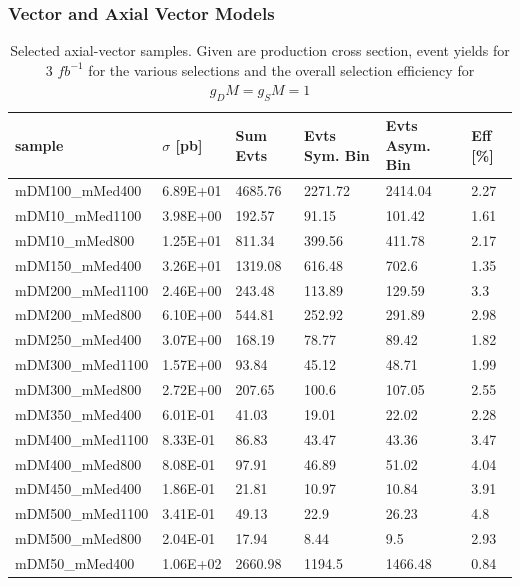 \subsubsection{Vector and Axial Vector Models}
\begin{table}[h]
\centering
\begin{tabular}{llllll}
\hline
sample             & $\sigma$ [pb] & Sum Evts       & Evts Sym. Bin & Evts Asym. Bin & Eff  [\%]   \\\hline
mDM100\_mMed400  & 6.89E+01 & 4685.76 & 2271.72 & 2414.04 & 2.27 \\
mDM10\_mMed1100  & 3.98E+00 & 192.57  & 91.15   & 101.42  & 1.61 \\
mDM10\_mMed800   & 1.25E+01 & 811.34  & 399.56  & 411.78  & 2.17 \\
mDM150\_mMed400  & 3.26E+01 & 1319.08 & 616.48  & 702.6   & 1.35 \\
mDM200\_mMed1100 & 2.46E+00 & 243.48  & 113.89  & 129.59  & 3.3  \\
mDM200\_mMed800  & 6.10E+00 & 544.81  & 252.92  & 291.89  & 2.98 \\
mDM250\_mMed400  & 3.07E+00 & 168.19  & 78.77   & 89.42   & 1.82 \\
mDM300\_mMed1100 & 1.57E+00 & 93.84   & 45.12   & 48.71   & 1.99 \\
mDM300\_mMed800  & 2.72E+00 & 207.65  & 100.6   & 107.05  & 2.55 \\
mDM350\_mMed400  & 6.01E-01 & 41.03   & 19.01   & 22.02   & 2.28 \\
mDM400\_mMed1100 & 8.33E-01 & 86.83   & 43.47   & 43.36   & 3.47 \\
mDM400\_mMed800  & 8.08E-01 & 97.91   & 46.89   & 51.02   & 4.04 \\
mDM450\_mMed400  & 1.86E-01 & 21.81   & 10.97   & 10.84   & 3.91 \\
mDM500\_mMed1100 & 3.41E-01 & 49.13   & 22.9    & 26.23   & 4.8  \\
mDM500\_mMed800  & 2.04E-01 & 17.94   & 8.44    & 9.5     & 2.93 \\
mDM50\_mMed400   & 1.06E+02 & 2660.98 & 1194.5  & 1466.48 & 0.84\\
\hline
\hline
\end{tabular}
\caption{Selected axial-vector samples. Given are production cross section, event yields for 3 $fb^{-1 }$ for the various selections and the overall selection efficiency for $g_DM=g_SM=1$}
\label{tab:dm_A_g1_3fb}
\end{table}



